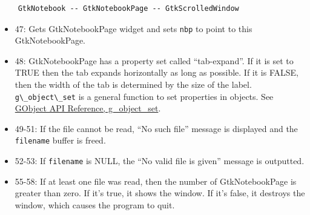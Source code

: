 \begin{lstlisting}
    GtkNotebook -- GtkNotebookPage -- GtkScrolledWindow
\end{lstlisting}

\begin{itemize}
\tightlist
\item
  47: Gets GtkNotebookPage widget and sets \passthrough{\lstinline!nbp!}
  to point to this GtkNotebookPage.
\item
  48: GtkNotebookPage has a property set called ``tab-expand''. If it is
  set to TRUE then the tab expands horizontally as long as possible. If
  it is FALSE, then the width of the tab is determined by the size of
  the label. \passthrough{\lstinline!g\_object\_set!} is a general
  function to set properties in objects. See
  \href{https://docs.gtk.org/gobject/method.Object.set.html}{GObject API
  Reference, g\_object\_set}.
\item
  49-51: If the file cannot be read, ``No such file'' message is
  displayed and the \passthrough{\lstinline!filename!} buffer is freed.
\item
  52-53: If \passthrough{\lstinline!filename!} is NULL, the ``No valid
  file is given'' message is outputted.
\item
  55-58: If at least one file was read, then the number of
  GtkNotebookPage is greater than zero. If it's true, it shows the
  window. If it's false, it destroys the window, which causes the
  program to quit.
\end{itemize}
